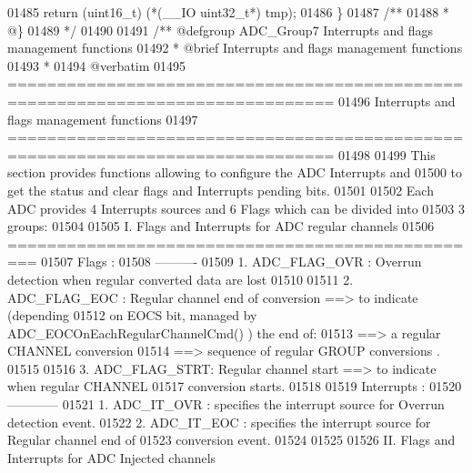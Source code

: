 \begin{DoxyCode}
01485   \textcolor{keywordflow}{return} (uint16\_t) (*(\_\_IO uint32\_t*)  tmp);
01486 \}
01487 \textcolor{comment}{/**}
01488 \textcolor{comment}{  * @\}}
01489 \textcolor{comment}{  */}
01490 
01491 \textcolor{comment}{/** @defgroup ADC\_Group7 Interrupts and flags management functions}
01492 \textcolor{comment}{ *  @brief   Interrupts and flags management functions}
01493 \textcolor{comment}{ *}
01494 \textcolor{comment}{@verbatim   }
01495 \textcolor{comment}{ ===============================================================================}
01496 \textcolor{comment}{                   Interrupts and flags management functions}
01497 \textcolor{comment}{ ===============================================================================  }
01498 \textcolor{comment}{}
01499 \textcolor{comment}{  This section provides functions allowing to configure the ADC Interrupts and }
01500 \textcolor{comment}{  to get the status and clear flags and Interrupts pending bits.}
01501 \textcolor{comment}{  }
01502 \textcolor{comment}{  Each ADC provides 4 Interrupts sources and 6 Flags which can be divided into }
01503 \textcolor{comment}{  3 groups:}
01504 \textcolor{comment}{  }
01505 \textcolor{comment}{  I. Flags and Interrupts for ADC regular channels}
01506 \textcolor{comment}{  =================================================}
01507 \textcolor{comment}{  Flags :}
01508 \textcolor{comment}{  ---------- }
01509 \textcolor{comment}{     1. ADC\_FLAG\_OVR : Overrun detection when regular converted data are lost}
01510 \textcolor{comment}{}
01511 \textcolor{comment}{     2. ADC\_FLAG\_EOC : Regular channel end of conversion ==> to indicate (depending }
01512 \textcolor{comment}{              on EOCS bit, managed by ADC\_EOCOnEachRegularChannelCmd() ) the end of:}
01513 \textcolor{comment}{               ==> a regular CHANNEL conversion }
01514 \textcolor{comment}{               ==> sequence of regular GROUP conversions .}
01515 \textcolor{comment}{}
01516 \textcolor{comment}{     3. ADC\_FLAG\_STRT: Regular channel start ==> to indicate when regular CHANNEL }
01517 \textcolor{comment}{              conversion starts.}
01518 \textcolor{comment}{}
01519 \textcolor{comment}{  Interrupts :}
01520 \textcolor{comment}{  ------------}
01521 \textcolor{comment}{     1. ADC\_IT\_OVR : specifies the interrupt source for Overrun detection event.  }
01522 \textcolor{comment}{     2. ADC\_IT\_EOC : specifies the interrupt source for Regular channel end of }
01523 \textcolor{comment}{                     conversion event.}
01524 \textcolor{comment}{  }
01525 \textcolor{comment}{  }
01526 \textcolor{comment}{  II. Flags and Interrupts for ADC Injected channels}

\end{DoxyCode}
